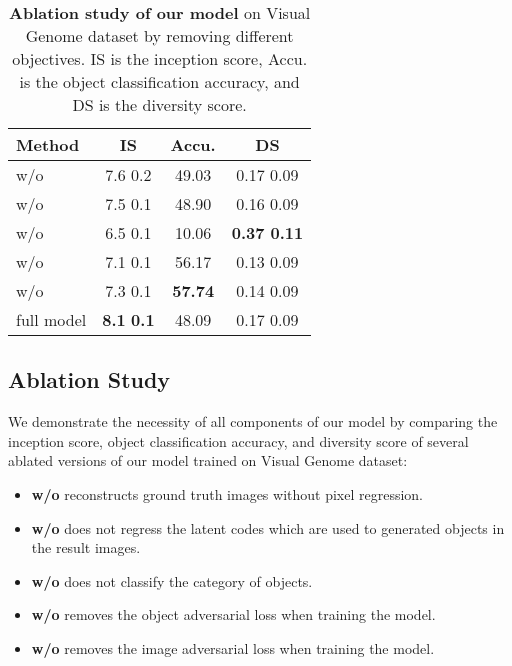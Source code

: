 \documentclass[10pt,twocolumn,letterpaper]{article}
\begin{document}
\begin{table}[!t]
\centering
\begin{tabular}{l|ccc}
\textbf{Method}     & \textbf{IS}   & \textbf{Accu.}  & \textbf{DS}   \\\hline 
w/o       & 7.6  0.2   & 49.03 & 0.17  0.09 \\
w/o    & 7.5  0.1   & 48.90 & 0.16  0.09 \\
w/o         & 6.5  0.1   & 10.06 & \textbf{0.37  0.11} \\
w/o  & 7.1  0.1 & 56.17 & 0.13  0.09\\
w/o  & 7.3  0.1 & \textbf{57.74} & 0.14  0.09 \\\hline
full model         & \textbf{8.1}  \textbf{0.1} & 48.09 &  0.17  0.09 \\ 
\end{tabular}
\vspace{0.1in}
\caption{\textbf{Ablation study of our model} on Visual Genome dataset by removing different objectives. IS is the inception score, Accu. is the object classification accuracy, and DS is the diversity score.}
\label{tb:ablation}
\vspace{-0.2in}
\end{table}



\subsection{Ablation Study}
We demonstrate the necessity of all components of our model by comparing the inception score, object classification accuracy, and diversity score of several ablated versions of our model trained on Visual Genome dataset:
\begin{itemize}[leftmargin=*]
\setlength{\itemsep}{0pt}
	\item \textbf{w/o } reconstructs ground truth images without pixel regression.
	\item \textbf{w/o } does not regress the latent codes which are used to generated objects in the result images.
	\item \textbf{w/o } does not classify the category of objects.
	\item \textbf{w/o } removes the object adversarial loss when training the model.
	\item \textbf{w/o } removes the image adversarial loss when training the model.
\end{itemize}
\end{document}
